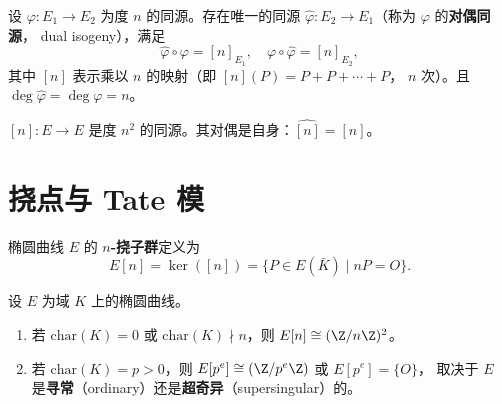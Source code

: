 \begin{definition}[对偶同源]
\label{def:dual-isogeny}
设 $\varphi\colon E_1 \to E_2$ 为度 $n$ 的同源。存在唯一的同源
$\hat{\varphi}\colon E_2 \to E_1$（称为 $\varphi$ 的\textbf{对偶同源}，
dual isogeny），满足
\[
  \hat{\varphi} \circ \varphi = [n]_{E_1}, \quad
  \varphi \circ \hat{\varphi} = [n]_{E_2},
\]
其中 $[n]$ 表示乘以 $n$ 的映射（即 $[n](P) = P + P + \cdots + P$，
$n$ 次）。且 $\deg \hat{\varphi} = \deg \varphi = n$。
\end{definition}

\begin{example}[乘法映射]
\label{ex:multiplication-map}
$[n]\colon E \to E$ 是度 $n^2$ 的同源。其对偶是自身：$\widehat{[n]} = [n]$。
\end{example}


\section{挠点与 Tate 模}
\label{sec:tate-module}

\begin{definition}[$n$-挠子群]
\label{def:torsion}
椭圆曲线 $E$ 的 \textbf{$n$-挠子群}定义为
\[
  E[n] = \ker([n]) = \{P \in E(\bar{K}) \mid nP = O\}.
\]
\end{definition}

\begin{theorem}[$n$-挠子群的结构]
\label{thm:torsion-structure}
设 $E$ 为域 $K$ 上的椭圆曲线。
\begin{enumerate}
  \item 若 $\mathrm{char}(K) = 0$ 或 $\mathrm{char}(K) \nmid n$，则
    $E[n] \cong (\Z/n\Z)^2$。
  \item 若 $\mathrm{char}(K) = p > 0$，则
    $E[p^e] \cong (\Z/p^e\Z)$ 或 $E[p^e] = \{O\}$，
    取决于 $E$ 是\textbf{寻常}（ordinary）还是\textbf{超奇异}（supersingular）的。
\end{enumerate}
\end{theorem}

